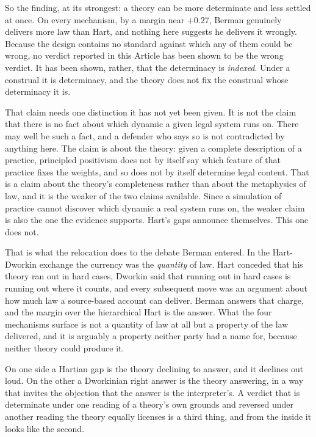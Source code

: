 So the finding, at its strongest: a theory can be more determinate and
less settled at once. On every mechanism, by a margin near $+0.27$, Berman genuinely delivers more
law than Hart, and nothing here suggests he delivers it wrongly. Because the design contains no standard against which any of them could be
wrong, no verdict reported in this Article has been shown to be the wrong
verdict. It has been shown, rather, that the determinacy is \textit{indexed}. Under a
construal it is determinacy, and the theory does not fix the construal whose
determinacy it is.

That claim needs one distinction it has not yet been given. It is not the
claim that there is no fact about which dynamic a given legal system runs on.
There may well be such a fact, and a defender who says so is not contradicted
by anything here. The claim is about the theory: given a complete description
of a practice, principled positivism does not by itself say which feature of
that practice fixes the weights, and so does not by itself determine legal
content. That is a claim about the theory's completeness rather than about the
metaphysics of law, and it is the weaker of the two claims available. Since a
simulation of practice cannot discover which dynamic a real system runs on,
the weaker claim is also the one the evidence supports. Hart's gaps announce themselves.
This one does not.

That is what the relocation does to the debate Berman entered. In the
Hart-Dworkin exchange the currency was the \textit{quantity} of law.
Hart conceded that his theory ran out in hard cases, Dworkin said that
running out in hard cases is running out where it counts, and every
subsequent move was an argument about how much law a source-based account
can deliver. Berman answers that charge, and the margin over the hierarchical Hart is
the answer. What the four mechanisms surface is not a quantity of law at
all but a property of the law delivered, and it is arguably a property
neither party had a name for, because neither theory could produce it. 

On one side a Hartian gap is the theory declining to answer, and it declines
out loud. On the other a Dworkinian right answer is the theory answering, in a way
that invites the objection that the answer is the interpreter's. A verdict that is determinate under one reading of a theory's own grounds and
reversed under another reading the theory equally licenses is a third thing,
and from the inside it looks like the second.

